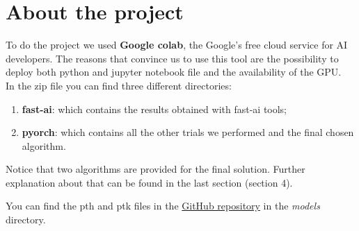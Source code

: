 \section{About the project}

To do the project we used \textbf{Google colab}, the Google's free cloud service for AI developers. The reasons that convince us to use this tool are the possibility to deploy both python and jupyter notebook file and the availability of the GPU. \\
In the zip file you can find three different directories:
\begin{enumerate}
	\item \textbf{fast-ai}: which contains the results obtained with fast-ai tools;
	\item \textbf{pyorch}: which contains all the other trials we performed and the final chosen algorithm.
\end{enumerate}

Notice that two algorithms are provided for the final solution. Further explanation about that can be found in the last section (section 4).

You can find the pth and ptk files in the \href{https://github.com/tafseerahmed/Deep-Learning-Project-UH18}{GitHub repository} in the \textit{models} directory. 



